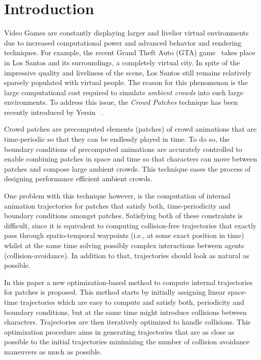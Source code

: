 \section{Introduction}
\label{sec:intro}

Video Games are constantly displaying larger and livelier virtual environments due to increased computational power and advanced behavior and rendering techniques.
For example, the recent Grand Theft Auto (GTA) game~\cite{GTA:web} takes place in Los Santos and its surroundings, a completely virtual city.
In spite of the impressive quality and liveliness of the scene, Los Santos still remains relatively sparsely populated with virtual people.
The reason for this phenomenon is the large computational cost required to simulate {\it ambient crowds} into such large environments.
To address this issue, the {\it Crowd Patches} technique has been recently introduced by Yersin \etal~\cite{Yersin:2009}.

Crowd patches are precomputed elements (patches) of crowd animations that are time-periodic so that they can be endlessly played in time.
To do so, the boundary conditions of precomputed animations are accurately controlled to enable combining patches in space and time so that characters can move between patches and compose large ambient crowds.
This technique eases the process of designing performance efficient ambient crowds. 

One problem with this technique however, is the computation of internal animation trajectories for patches that satisfy both, time-periodicity and boundary conditions amongst patches.
Satisfying both of these constraints is difficult, since it is equivalent to computing collision-free trajectories that exactly pass through spatio-temporal waypoints (i.e., at some exact position in time) whilst at the same time solving possibly complex interactions between agents (collision-avoidance).
In addition to that, trajectories should look as natural as possible.

In this paper a new optimization-based method to compute internal trajectories for patches is proposed.
This method starts by initially assigning linear space-time trajectories which are easy to compute and satisfy both, periodicity and boundary conditions, but at the same time might introduce collisions between characters.
Trajectories are then iteratively optimized to handle collisions.
This optimization procedure aims in generating trajectories that are as close as possible to the initial trajectories minimizing the number of collision avoidance maneuvers as much as possible.

